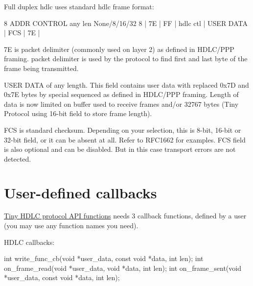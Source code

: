 Full duplex hdlc uses standard hdlc frame format\+: 
\begin{DoxyPre}
     8     ADDR  CONTROL     any len    None/8/16/32     8
 |   7E   | FF | hdlc ctl | USER DATA  |    FCS     |   7E   |
\end{DoxyPre}



\begin{DoxyItemize}
\item 7E is packet delimiter (commonly used on layer 2) as defined in H\+D\+L\+C/\+P\+PP framing. packet delimiter is used by the protocol to find first and last byte of the frame being transmitted.
\item U\+S\+ER D\+A\+TA of any length. This field contains user data with replaced 0x7D and 0x7E bytes by special sequenced as defined in H\+D\+L\+C/\+P\+PP framing. Length of data is now limited on buffer used to receive frames and/or 32767 bytes (Tiny Protocol using 16-\/bit field to store frame length).
\item F\+CS is standard checksum. Depending on your selection, this is 8-\/bit, 16-\/bit or 32-\/bit field, or it can be absent at all. Refer to R\+F\+C1662 for examples. F\+CS field is also optional and can be disabled. But in this case transport errors are not detected.
\end{DoxyItemize}\hypertarget{index_callback}{}\section{User-\/defined callbacks}\label{index_callback}
\hyperlink{group__HDLC__API}{Tiny H\+D\+LC protocol A\+PI functions} needs 3 callback functions, defined by a user (you may use any function names you need).

H\+D\+LC callbacks\+: 
\begin{DoxyCode}
\textcolor{keywordtype}{int} write\_func\_cb(\textcolor{keywordtype}{void} *user\_data, \textcolor{keyword}{const} \textcolor{keywordtype}{void} *data, \textcolor{keywordtype}{int} len);
\textcolor{keywordtype}{int} on\_frame\_read(\textcolor{keywordtype}{void} *user\_data, \textcolor{keywordtype}{void} *data, \textcolor{keywordtype}{int} len);
\textcolor{keywordtype}{int} on\_frame\_sent(\textcolor{keywordtype}{void} *user\_data, \textcolor{keyword}{const} \textcolor{keywordtype}{void} *data, \textcolor{keywordtype}{int} len);
\end{DoxyCode}



